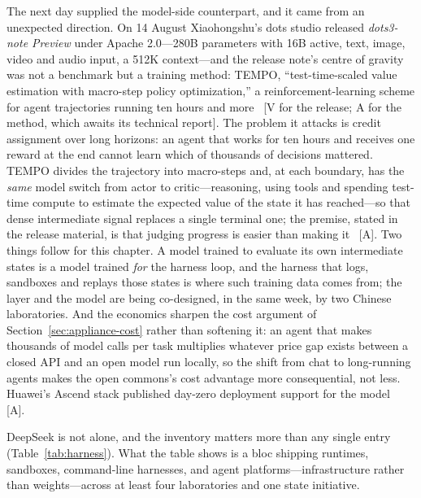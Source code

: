 The next day supplied the model-side counterpart, and it came from an unexpected direction. On 14 August Xiaohongshu's dots studio released \emph{dots3-note Preview} under Apache 2.0---280B parameters with 16B active, text, image, video and audio input, a 512K context---and the release note's centre of gravity was not a benchmark but a training method: TEMPO, ``test-time-scaled value estimation with macro-step policy optimization,'' a reinforcement-learning scheme for agent trajectories running ten hours and more~\cite{dots3-note} [V for the release; A for the method, which awaits its technical report]. The problem it attacks is credit assignment over long horizons: an agent that works for ten hours and receives one reward at the end cannot learn which of thousands of decisions mattered. TEMPO divides the trajectory into macro-steps and, at each boundary, has the \emph{same} model switch from actor to critic---reasoning, using tools and spending test-time compute to estimate the expected value of the state it has reached---so that dense intermediate signal replaces a single terminal one; the premise, stated in the release material, is that judging progress is easier than making it~\cite{dots3-note-press} [A]. Two things follow for this chapter. A model trained to evaluate its own intermediate states is a model trained \emph{for} the harness loop, and the harness that logs, sandboxes and replays those states is where such training data comes from; the layer and the model are being co-designed, in the same week, by two Chinese laboratories. And the economics sharpen the cost argument of Section~\ref{sec:appliance-cost} rather than softening it: an agent that makes thousands of model calls per task multiplies whatever price gap exists between a closed API and an open model run locally, so the shift from chat to long-running agents makes the open commons's cost advantage more consequential, not less. Huawei's Ascend stack published day-zero deployment support for the model~\cite{dots3-ascend} [A].

DeepSeek is not alone, and the inventory matters more than any single entry (Table~\ref{tab:harness}). What the table shows is a bloc shipping runtimes, sandboxes, command-line harnesses, and agent platforms---infrastructure rather than weights---across at least four laboratories and one state initiative.


